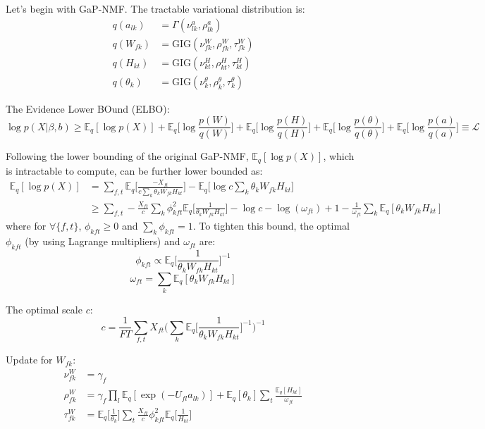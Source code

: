 \documentclass{article}
\begin{document}
Let's begin with GaP-NMF. The tractable variational distribution is:
\begin{align*}
q(a_{lk}) &= \Gamma(\nu_{lk}^a, \rho_{lk}^a)\\
q(W_{fk}) &= \text{GIG}(\nu_{fk}^W, \rho_{fk}^W, \tau_{fk}^W)\\
q(H_{kt}) &= \text{GIG}(\nu_{kt}^H, \rho_{kt}^H, \tau_{kt}^H)\\
q(\theta_{k}) &= \text{GIG}(\nu_{k}^{\theta}, \rho_{k}^{\theta}, \tau_{k}^{\theta})
\end{align*}

The Evidence Lower BOund (ELBO):
\[
\log p(X|\beta, b) \geq \mathbb{E}_q [\log p(X)] + \mathbb{E}_q \biggl[\log \frac{p(W)}{q(W)}\biggl] + \mathbb{E}_q \biggl[\log \frac{p(H)}{q(H)}\biggl] + \mathbb{E}_q\biggl[\log \frac{p(\theta)}{q(\theta)}\biggl] + \mathbb{E}_q\biggl[\log \frac{p(a)}{q(a)}\biggl] \equiv \mathcal{L}
\]

Following the lower bounding of the original GaP-NMF, $\mathbb{E}_q[\log p(X)]$, which is intractable to compute, can be further lower bounded as:
\begin{align*}
\mathbb{E}_q[\log p(X)] &= \sum_{f,t} \mathbb{E}_q \biggl[\frac{- X_{ft}}{c \sum_k \theta_k W_{fk} H_{kt}} \biggl] - \mathbb{E}_q \biggl[\log c \sum_k \theta_k W_{fk} H_{kt} \biggl] \\
&\geq \sum_{f, t} - \frac{X_{ft}}{c}\sum_k \phi_{kft}^2 \mathbb{E}_q\biggl[\frac{1}{\theta_k W_{fk} H_{kt}}\biggl] - \log c - \log(\omega_{ft}) + 1 - \frac{1}{\omega_{ft}}\sum_k \mathbb{E}_q[\theta_k W_{fk} H_{kt}]
\end{align*}
where for $\forall \{f,t\}$, $\phi_{kft} \geq 0$ and $\sum_k \phi_{kft} = 1$. To tighten this bound, the optimal $\phi_{kft}$  (by using Lagrange multipliers) and $\omega_{ft}$ are:
\[
\phi_{kft} \propto \mathbb{E}_q\biggl[ \frac{1}{\theta_k W_{fk} H_{kt}}\biggl]^{-1}
\]
\[
\omega_{ft} = \sum_k \mathbb{E}_q [\theta_k W_{fk} H_{kt}]
\]

The optimal scale $c$:
\[
c = \frac{1}{FT}\sum_{f,t} X_{ft} \biggl(\sum_k \mathbb{E}_q\biggl[\frac{1}{\theta_k W_{fk} H_{kt}}\biggl]^{-1}\biggl)^{-1}
\]


Update for $W_{fk}$:
\begin{align*}
\nu_{fk}^W &= \gamma_f\\
\rho_{fk}^W &= \gamma_f \prod_l \mathbb{E}_q[\exp(-U_{fl}a_{lk})] + \mathbb{E}_q[\theta_k]\sum_t \frac{\mathbb{E}_q[H_{kt}]}{\omega_{ft}}\\
\tau_{fk}^W &= \mathbb{E}_q\biggl[\frac{1}{\theta_k}\biggl]\sum_t \frac{X_{ft}}{c} \phi_{kft}^2 \mathbb{E}_q \biggl[\frac{1}{H_{kt}}\biggl]
\end{align*}
\end{document}
